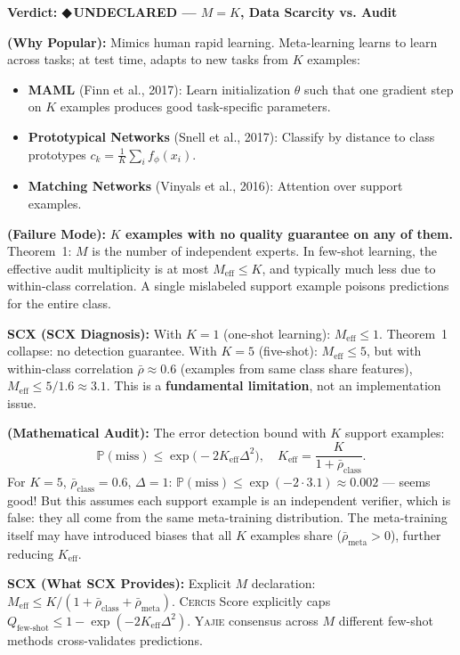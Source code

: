 \documentclass[12pt,a4paper]{article}
\theoremstyle{definition}
\newcommand{\guilty}{{\color{guiltycolor}\textbf{◆\,UNDECLARED}}}
\newcommand{\Yajie}{\textsc{Yajie}}
\newcommand{\Cercis}{\textsc{Cercis}}
\newcommand{\Pbb}{\mathbb{P}}
\newcommand{\auditHeader}[1]{\medskip\noindent\textbf{\large #1}\medskip}
\newcommand{\whyPopular}{\noindent\textbf{ (Why Popular):} }
\newcommand{\whyFail}{\noindent\textbf{ (Failure Mode):} }
\newcommand{\whatMissing}{\noindent\textbf{SCX (What SCX Provides):} }
\newcommand{\diagnosis}{\noindent\textbf{SCX (SCX Diagnosis):} }
\newcommand{\mathAudit}{\noindent\textbf{ (Mathematical Audit):} }
\begin{document}
\auditHeader{Verdict: \guilty{} — $M=K$, Data Scarcity vs. Audit}

\whyPopular{} Mimics human rapid learning. Meta-learning learns to learn across tasks; at test time, adapts to new tasks from $K$ examples:
\begin{itemize}[nosep]
    \item \textbf{MAML} (Finn et al., 2017): Learn initialization $\theta$ such that one gradient step on $K$ examples produces good task-specific parameters.
    \item \textbf{Prototypical Networks} (Snell et al., 2017): Classify by distance to class prototypes $c_k = \frac{1}{K}\sum_i f_\phi(x_i)$.
    \item \textbf{Matching Networks} (Vinyals et al., 2016): Attention over support examples.
\end{itemize}

\whyFail{} \textbf{$K$ examples with no quality guarantee on any of them.} Theorem~1: $M$ is the number of independent experts. In few-shot learning, the effective audit multiplicity is at most $M_{\text{eff}} \le K$, and typically much less due to within-class correlation. A single mislabeled support example poisons predictions for the entire class.

\diagnosis{} With $K=1$ (one-shot learning): $M_{\text{eff}} \le 1$. Theorem~1 collapse: no detection guarantee. With $K=5$ (five-shot): $M_{\text{eff}} \le 5$, but with within-class correlation $\bar{\rho} \approx 0.6$ (examples from same class share features), $M_{\text{eff}} \le 5/1.6 \approx 3.1$. This is a \textbf{fundamental limitation}, not an implementation issue.

\mathAudit{} The error detection bound with $K$ support examples:
\[
\Pbb(\text{miss}) \le \exp\bigl(-2K_{\text{eff}}\Delta^2\bigr), \quad K_{\text{eff}} = \frac{K}{1 + \bar{\rho}_{\text{class}}}.
\]
For $K=5$, $\bar{\rho}_{\text{class}}=0.6$, $\Delta=1$: $\Pbb(\text{miss}) \le \exp(-2 \cdot 3.1) \approx 0.002$ — seems good! But this assumes each support example is an independent verifier, which is false: they all come from the same meta-training distribution. The meta-training itself may have introduced biases that all $K$ examples share ($\bar{\rho}_{\text{meta}} > 0$), further reducing $K_{\text{eff}}$.

\whatMissing{} Explicit $M$ declaration: $M_{\text{eff}} \le K/(1 + \bar{\rho}_{\text{class}} + \bar{\rho}_{\text{meta}})$. \Cercis{} Score explicitly caps $Q_{\text{few-shot}} \le 1 - \exp(-2K_{\text{eff}}\Delta^2)$. \Yajie{} consensus across $M$ different few-shot methods cross-validates predictions.
\end{document}
